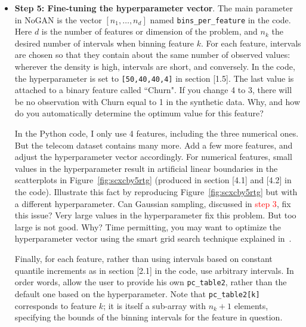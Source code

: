 \documentclass[oneside,10pt]{book}
\begin{document}
\begin{itemize}
\item[]{\bf Step 5: Fine-tuning the hyperparameter vector}. The main parameter in NoGAN
 is the vector $[n_1,\dots,n_d]$ named \texttt{bins\_per\_feature} in the code. Here $d$ is the number of features
 or dimension of the problem, and $n_k$ the desired number of intervals when binning feature $k$. For each feature, intervals are chosen so that they contain about the same number of observed values: wherever the density is high, intervals are short, and conversely.
 In the code, the \textcolor{index}{hyperparameter} is set to \texttt{[50,40,40,4]} in section [1.5]. The last value is attached to a
 binary feature called ``Churn". If you change 4 to 3, there will be no observation with Churn equal to 1 in the synthetic data. Why, and how 
 do you automatically determine the optimum value for this feature?

In the Python code, I only use 4 features, including the three numerical ones. But the telecom dataset contains many more. 
 Add a few more features, and adjust the hyperparameter vector accordingly. For numerical features, small values in the hyperparameter  result in artificial linear boundaries in the scatterplots in Figure~\ref{fig:scxcby5rtg} (produced in section [4.1] and [4.2] in the code). Illustrate this fact by
 reproducing Figure~\ref{fig:scxcby5rtg} but with a different hyperparameter. Can Gaussian sampling, discussed in \textcolor{red}{step 3}, fix this issue?
Very large values in the hyperparameter fix this problem. But too large is not good. Why? Time permitting, you may
 want to optimize the hyperparameter vector using the smart grid search technique explained in~\cite{vgsmart}.

Finally, for each feature, rather than using intervals based on constant \textcolor{index}{quantile} increments as in section [2.1] in the code,
 use arbitrary intervals. In order words, allow the user to provide his own \texttt{pc\_table2}, rather than the default one
 based on the hyperparameter. Note that \texttt{pc\_table2[k]} corresponds to feature $k$; it is itself a sub-array 
with $n_k +1$ elements, specifying the bounds of the binning intervals for the feature in question.
\vspace{1ex}


\end{itemize}
\end{document}
